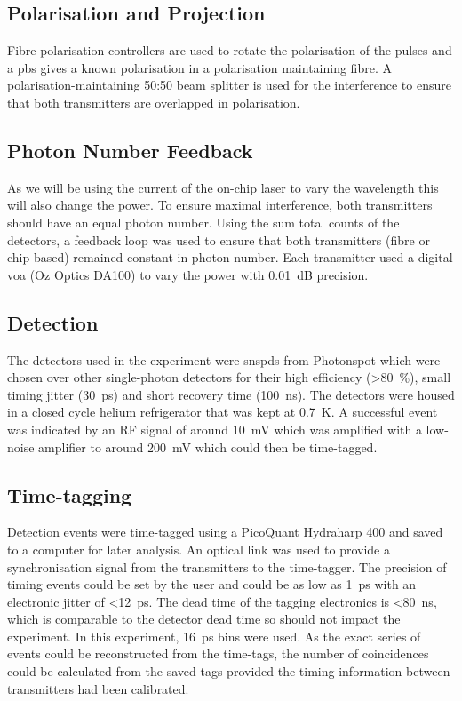 \subsection{Polarisation and Projection}

Fibre polarisation controllers are used to rotate the polarisation of the pulses and a \ac{pbs} gives a known polarisation in a polarisation maintaining fibre. A polarisation-maintaining {50:50} beam splitter is used for the interference to ensure that both transmitters are overlapped in polarisation.

\subsection{Photon Number Feedback}

As we will be using the current of the on-chip laser to vary the wavelength this will also change the power. To ensure maximal interference, both transmitters should have an equal photon number. Using the sum total counts of the detectors, a feedback loop was used to ensure that both transmitters (fibre or chip-based) remained constant in photon number. Each transmitter used a digital \ac{voa} (Oz Optics DA100) to vary the power with \SI{0.01}{dB} precision.

\subsection{Detection}

The detectors used in the experiment were \acp{snspd} from Photonspot which were chosen over other single-photon detectors for their high efficiency (\SI{>80}{\percent}), small timing jitter (\SI{30}{\ps}) and short recovery time (\SI{100}{\ns}). The detectors were housed in a closed cycle helium refrigerator that was kept at \SI{0.7}{K}. A successful event was indicated by an RF signal of around \SI{10}{\mV} which was amplified with a low-noise amplifier to around \SI{200}{\mV} which could then be time-tagged.

\subsection{Time-tagging}

Detection events were time-tagged using a PicoQuant Hydraharp 400 and saved to a computer for later analysis. An optical link was used to provide a synchronisation signal from the transmitters to the time-tagger. The precision of timing events could be set by the user and could be as low as \SI{1}{\ps} with an electronic jitter of \SI{<12}{\ps}. The dead time of the tagging electronics is \SI{<80}{\ns}, which is comparable to the detector dead time so should not impact the experiment. In this experiment, \SI{16}{\ps} bins were used. As the exact series of events could be reconstructed from the time-tags, the number of coincidences could be calculated from the saved tags provided the timing information between transmitters had been calibrated.

